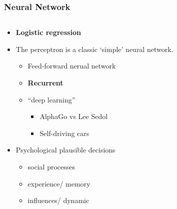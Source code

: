\documentclass[compress]{beamer}
\begin{document}
    \begin{frame}[Basic2]\frametitle{Neural Network}
        \begin{columns}
            \begin{column}{0.5\linewidth}
                \vspace{3mm}
                \footnotesize
                        \begin{itemize}
                            \item \textbf{Logistic regression}
                            \item The perceptron is a classic `simple' neural network.
                            \begin{itemize}
                                \item Feed-forward nerual network
                                \item \textbf{Recurrent}
                                \item ``deep learning''
                                \begin{itemize}
                                    \item AlphaGo vs Lee Sedol
                                    \item Self-driving cars
                                \end{itemize}
                            \end{itemize}
                            \item Psychological plausible decisions
                            \begin{itemize}
                                \item social processes
                                \item experience/ memory
                                \item influences/ dynamic
                            \end{itemize}
                        \end{itemize}
            \end{column}
            \begin{column}{0.5\linewidth}
                \vspace{7mm}
                \begin{figure}
                    \centering

\end{figure}
\end{column}
\end{columns}
\end{frame}
\end{document}

